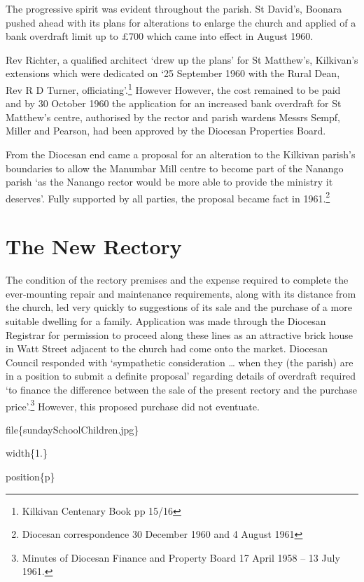 The progressive spirit was evident throughout the parish. St David's, Boonara pushed ahead with its plans for alterations to enlarge the church and applied of a bank overdraft limit up to £700 which came into effect in August 1960.

Rev Richter, a qualified architect `drew up the plans' for St Matthew's, Kilkivan's extensions which were dedicated on `25 September 1960 with the Rural Dean, Rev R D Turner, officiating'.\footnote{Kilkivan Centenary Book pp 15/16} However However, the cost remained to be paid and by 30 October 1960 the application for an increased bank overdraft for St Matthew's centre, authorised by the rector and parish wardens Messrs Sempf, Miller and Pearson, had been approved by the Diocesan Properties Board.

From the Diocesan end came a proposal for an alteration to the Kilkivan parish's boundaries to allow the Manumbar Mill centre to become part of the Nanango parish `as the Nanango rector would be more able to provide the ministry it deserves'. Fully supported by all parties, the proposal became fact in 1961.\footnote{Diocesan correspondence 30 December 1960 and 4 August 1961}

\hypertarget{the-new-rectory}{%
\section{The New Rectory}\label{the-new-rectory}}

The condition of the rectory premises and the expense required to complete the ever-mounting repair and maintenance requirements, along with its distance from the church, led very quickly to suggestions of its sale and the purchase of a more suitable dwelling for a family. Application was made through the Diocesan Registrar for permission to proceed along these lines as an attractive brick house in Watt Street adjacent to the church had come onto the market. Diocesan Council responded with `sympathetic consideration \ldots{} when they (the parish) are in a position to submit a definite proposal' regarding details of overdraft required `to finance the difference between the sale of the present rectory and the purchase price'.\footnote{Minutes of Diocesan Finance and Property Board 17 April 1958 -- 13 July 1961.} However, this proposed purchase did not eventuate.

file\{sundaySchoolChildren.jpg\}

width\{1.\}

position\{p\}

